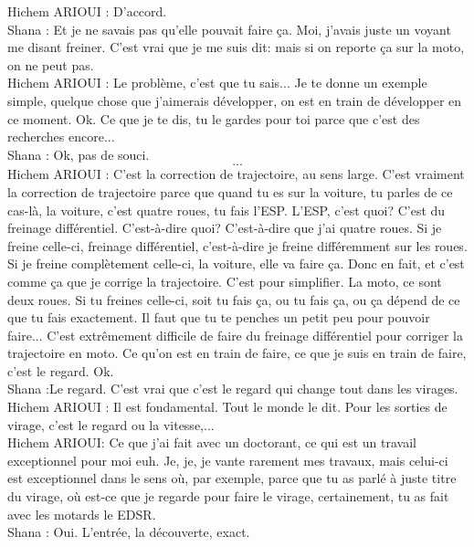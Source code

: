 Hichem ARIOUI : D'accord. \\
Shana : Et je ne savais pas qu'elle pouvait faire ça. Moi, j'avais juste un voyant me disant freiner. C'est vrai que je me suis dit: mais si on reporte ça sur la moto, on ne peut pas. \\
Hichem ARIOUI : Le problème, c'est que tu sais... Je te donne un exemple simple, quelque chose que j'aimerais développer, on est en train de développer en ce moment. Ok. Ce que je te dis, tu le gardes pour toi parce que c'est des recherches encore... \\
Shana : Ok, pas de souci.\\
\[...\]
\ifconfidentiel
Hichem ARIOUI : C'est la correction de trajectoire, au sens large. C'est vraiment la correction de trajectoire parce que quand tu es sur la voiture, tu parles de ce cas-là, la voiture, c'est quatre roues, tu fais l'ESP. L'ESP, c'est quoi? C'est du freinage différentiel. C'est-à-dire quoi? C'est-à-dire que j'ai quatre roues. Si je freine celle-ci, freinage différentiel, c'est-à-dire je freine différemment sur les roues. Si je freine complètement celle-ci, la voiture, elle va faire ça. Donc en fait, et c'est comme ça que je corrige la trajectoire. C'est pour simplifier. La moto, ce sont deux roues. Si tu freines celle-ci, soit tu fais ça, ou tu fais ça, ou ça dépend de ce que tu fais exactement. Il faut que tu te penches un petit peu pour pouvoir faire... C'est extrêmement difficile de faire du freinage différentiel pour corriger la trajectoire en moto. Ce qu'on est en train de faire, ce que je suis en train de faire, c'est le regard. Ok. \\
\fi
Shana :Le regard. C'est vrai que c'est le regard qui change tout dans les virages. \\
Hichem ARIOUI : Il est fondamental.
Tout le monde le dit. Pour les sorties de virage, c'est le regard ou la vitesse,... \\
Hichem ARIOUI: Ce que j'ai fait avec un doctorant, ce qui est un travail exceptionnel pour moi euh. Je, je, je vante rarement mes travaux, mais celui-ci est exceptionnel dans le sens où, par exemple, parce que tu as parlé à juste titre du virage, où est-ce que je regarde pour faire le virage, certainement, tu as fait avec les motards le EDSR. \\
Shana : Oui. L'entrée, la découverte, exact. \\
